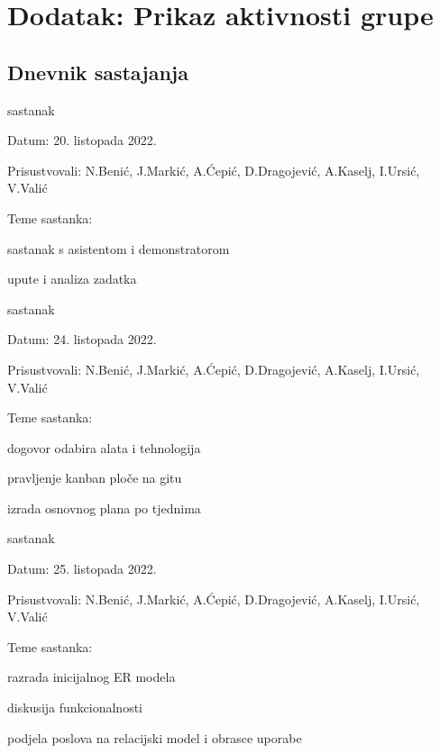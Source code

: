 \chapter*{Dodatak: Prikaz aktivnosti grupe}
		
		\section*{Dnevnik sastajanja}
		
		\begin{packed_enum}
			\item  sastanak
			
			\item[] \begin{packed_item}
				\item Datum: 20. listopada 2022.
				\item Prisustvovali: N.Benić, J.Markić, A.Ćepić, D.Dragojević, A.Kaselj, I.Ursić, V.Valić
				\item Teme sastanka:
				\begin{packed_item}
					\item  sastanak s asistentom i demonstratorom
					\item  upute i analiza zadatka
				\end{packed_item}
			\end{packed_item}
			
			\item  sastanak
			\item[] \begin{packed_item}
				\item Datum: 24. listopada 2022.
				\item Prisustvovali: N.Benić, J.Markić, A.Ćepić, D.Dragojević, A.Kaselj, I.Ursić, V.Valić
				\item Teme sastanka:
				\begin{packed_item}
					\item  dogovor odabira alata i tehnologija
					\item  pravljenje kanban ploče na gitu
					\item  izrada osnovnog plana po tjednima
				\end{packed_item}
			\end{packed_item}
		
			\item  sastanak
			\item[] \begin{packed_item}
				\item Datum: 25. listopada 2022.
				\item Prisustvovali: N.Benić, J.Markić, A.Ćepić, D.Dragojević, A.Kaselj, I.Ursić, V.Valić
				\item Teme sastanka:
				\begin{packed_item}
					\item  razrada inicijalnog ER modela
					\item  diskusija funkcionalnosti
					\item  podjela poslova na relacijski model i obrasce uporabe
				\end{packed_item}
			\end{packed_item}
		

\end{packed_enum}
